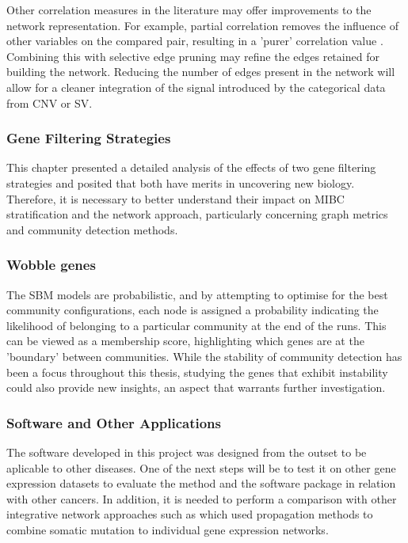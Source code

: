 Other correlation measures in the literature may offer improvements to the network representation. For example, partial correlation removes the influence of other variables on the compared pair, resulting in a 'purer' correlation value \citep{De_la_Fuente2004-ts}. Combining this with selective edge pruning may refine the edges retained for building the network. Reducing the number of edges present in the network will allow for a cleaner integration of the signal introduced by the categorical data from CNV or SV.

\subsubsection*{Gene Filtering Strategies}

This chapter presented a detailed analysis of the effects of two gene filtering strategies and posited that both have merits in uncovering new biology. Therefore, it is necessary to better understand their impact on MIBC stratification and the network approach, particularly concerning graph metrics and community detection methods. 

\subsubsection*{Wobble genes}

The SBM models are probabilistic, and by attempting to optimise for the best community configurations, each node is assigned a probability indicating the likelihood of belonging to a particular community at the end of the runs. This can be viewed as a membership score, highlighting which genes are at the 'boundary' between communities. While the stability of community detection has been a focus throughout this thesis, studying the genes that exhibit instability could also provide new insights, an aspect that warrants further investigation.

\subsubsection*{Software and Other Applications}

The software developed in this project was designed from the outset to be aplicable to other diseases. One of the next steps will be to test it on other gene expression datasets to evaluate the method and the software package in relation with other cancers. In addition, it is needed to perform a comparison with other integrative network approaches such as \citet{Hofree2013-ld,He2017-dj} which used propagation methods to combine somatic mutation to individual gene expression networks.


